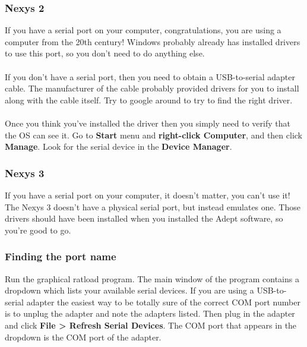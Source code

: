 \documentclass[notitlepage]{article}
\begin{document}
\subsubsection{Nexys 2}
If you have a serial port on your computer, congratulations, you are using a computer from the 20th century! Windows probably already has installed drivers to use this port, so you don't need to do anything else.\\\\
If you don't have a serial port, then you need to obtain a USB-to-serial adapter cable. The manufacturer of the cable probably provided drivers for you to install along with the cable itself. Try to google around to try to find the right driver.\\\\
Once you think you've installed the driver then you simply need to verify that the OS can see it. Go to \textbf{Start} menu and \textbf{right-click Computer}, and then click \textbf{Manage}. Look for the serial device in the \textbf{Device Manager}.

\subsubsection{Nexys 3}
If you have a serial port on your computer, it doesn't matter, you can't use it! The Nexys 3 doesn't have a physical serial port, but instead emulates one. Those drivers should have been installed when you installed the Adept software, so you're good to go.

\subsubsection{Finding the port name}
Run the graphical ratload program. The main window of the program contains a dropdown which lists your available serial devices. If you are using a USB-to-serial adapter the easiest way to be totally sure of the correct COM port number is to unplug the adapter and note the adapters listed. Then plug in the adapter and click \textbf{File > Refresh Serial Devices}. The COM port that appears in the dropdown is the COM port of the adapter.
\end{document}
